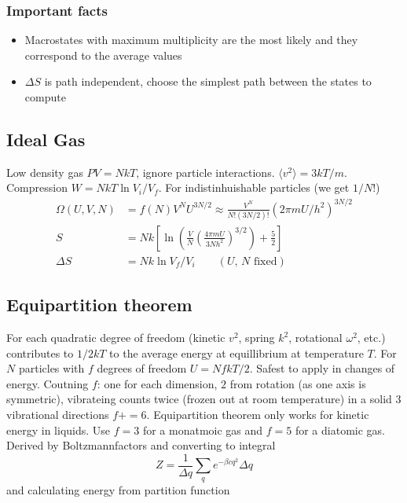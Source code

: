 \documentclass[a4paper, norsk, 8pt]{article}
\begin{document}
\begin{multicols*}{3}
\subsubsection*{\scriptsize Important facts}
\begin{itemize}
  \item Macrostates with maximum multiplicity are the most likely and they correspond to the average values
  \item $\Delta S$ is path independent, choose the simplest path between the states to compute
\end{itemize}

\subsection*{\footnotesize  Ideal Gas}
Low density gas $PV=NkT$, ignore particle interactions. $\langle v^2 \rangle = 3kT/m$. Compression $W =NkT\ln{V_i/V_f}$.
For indistinhuishable particles (we get $1/N!$)
\begin{align*}
  \Omega(U, V, N) &= f(N)V^NU^{3N/2} \approx \frac{V^N}{N!(3N/2)!}(2\pi mU/h^2)^{3N/2} \\
  S &= Nk\left[\ln\left( \frac{V}{N}\left( \frac{4\pi m U}{3Nh^2} \right)^{3/2}  \right) + \frac{5}{2}\right] \\
  \Delta S &= Nk\ln{V_f/V_i} \qquad (\text{$U$, $N$ fixed})
\end{align*}


\subsection*{\footnotesize  Equipartition theorem}
For each quadratic degree of freedom (kinetic $v^2$, spring $k^2$, rotational $\omega^2$, etc.) contributes to $1/2kT$ to the average energy at equillibrium at temperature $T$. For $N$ particles with $f$ degrees of freedom $U = NfkT/2$. Safest to apply in changes of energy. Coutning $f$: one for each dimension, $2$ from rotation (as one axis is symmetric), vibrateing counts twice (frozen out at room temperature) in a solid $3$ vibrational directions $f+=6$. Equipartition theorem only works for kinetic energy in liquids. Use $f=3$ for a monatmoic gas and $f=5$ for a diatomic gas.\\
Derived by Boltzmannfactors and converting to integral
\begin{equation*}
    Z = \frac{1}{\Delta q}\sum_q e^{-\beta c q^2}\Delta q
\end{equation*}
and calculating energy from partition function

\end{multicols*}
\end{document}
